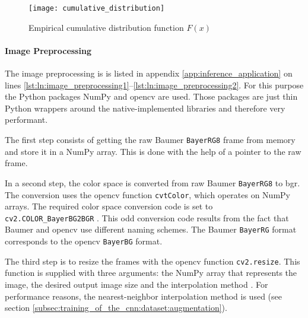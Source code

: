 \begin{figure}
  \centering
  \texttt{[image: cumulative\_distribution]}
  \caption{Empirical cumulative distribution function $F(x)$}
  \label{fig:cumulative_distribution}
\end{figure}

\paragraph{Image Preprocessing}
The image preprocessing is is listed in appendix \ref{app:inference_application} on lines \ref{lst:ln:image_preprocessing1}--\ref{lst:ln:image_preprocessing2}.
For this purpose the Python packages NumPy and \acrshort{opencv} are used.
Those packages are just thin Python wrappers around the native-implemented libraries and therefore very performant.

The first step consists of getting the raw Baumer \texttt{BayerRG8} frame from memory and store it in a NumPy array.
This is done with the help of a pointer to the raw frame.

In a second step, the color space is converted from raw Baumer \texttt{BayerRG8} to \acrshort{bgr}.
The conversion uses the \acrshort{opencv} function \texttt{cvtColor}, which operates on NumPy arrays.
The required color space conversion code is set to \texttt{cv2.COLOR\_BayerBG2BGR} \cite{}. %
This odd conversion code results from the fact that Baumer and \acrshort{opencv} use different naming schemes.
The Baumer \texttt{BayerRG} format corresponds to the \acrshort{opencv} \texttt{BayerBG} format.

The third step is to resize the frames with the \acrshort{opencv} function \texttt{cv2.resize}.
This function is supplied with three arguments: the NumPy array that represents the image, the desired output image size and the interpolation method \cite{}. %
For performance reasons, the nearest-neighbor interpolation method is used (see section \ref{subsec:training_of_the_cnn:dataset:augmentation}).

